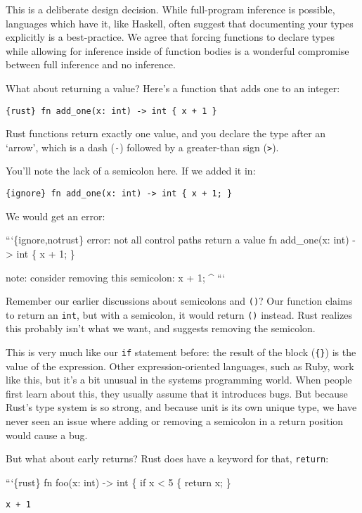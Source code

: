 \documentclass[]{article}
\begin{document}
This is a deliberate design decision. While full-program inference is
possible, languages which have it, like Haskell, often suggest that
documenting your types explicitly is a best-practice. We agree that
forcing functions to declare types while allowing for inference inside
of function bodies is a wonderful compromise between full inference and
no inference.

What about returning a value? Here's a function that adds one to an
integer:

\texttt{\{rust\} fn add\_one(x: int) -\textgreater{} int \{     x + 1 \}}

Rust functions return exactly one value, and you declare the type after
an `arrow', which is a dash (\texttt{-}) followed by a greater-than sign
(\texttt{\textgreater{}}).

You'll note the lack of a semicolon here. If we added it in:

\texttt{\{ignore\} fn add\_one(x: int) -\textgreater{} int \{     x + 1; \}}

We would get an error:

```\{ignore,notrust\} error: not all control paths return a value fn
add\_one(x: int) -\textgreater{} int \{ x + 1; \}

note: consider removing this semicolon: x + 1; \^{} ```

Remember our earlier discussions about semicolons and \texttt{()}? Our
function claims to return an \texttt{int}, but with a semicolon, it
would return \texttt{()} instead. Rust realizes this probably isn't what
we want, and suggests removing the semicolon.

This is very much like our \texttt{if} statement before: the result of
the block (\texttt{\{\}}) is the value of the expression. Other
expression-oriented languages, such as Ruby, work like this, but it's a
bit unusual in the systems programming world. When people first learn
about this, they usually assume that it introduces bugs. But because
Rust's type system is so strong, and because unit is its own unique
type, we have never seen an issue where adding or removing a semicolon
in a return position would cause a bug.

But what about early returns? Rust does have a keyword for that,
\texttt{return}:

```\{rust\} fn foo(x: int) -\textgreater{} int \{ if x \textless{} 5 \{
return x; \}

\begin{verbatim}
x + 1
\end{verbatim}
\end{document}
